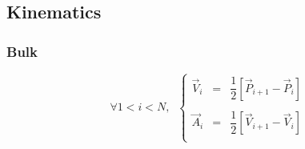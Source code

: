 \documentclass[aps,12pt]{revtex4}
\begin{document}
\subsection{Kinematics}

\subsubsection{Bulk}

\begin{equation}
\forall 1 < i < N, \;\;
\left\lbrace
\begin{array}{rcl}
	\vec{V}_i & = & \dfrac{1}{2} \left[ \vec{P}_{i+1} - \vec{P}_i\right]\\
	\\
	\vec{A}_i & = & \dfrac{1}{2} \left[ \vec{V}_{i+1} - \vec{V}_i\right]\\
\end{array}
\right.
\end{equation}
\end{document}
